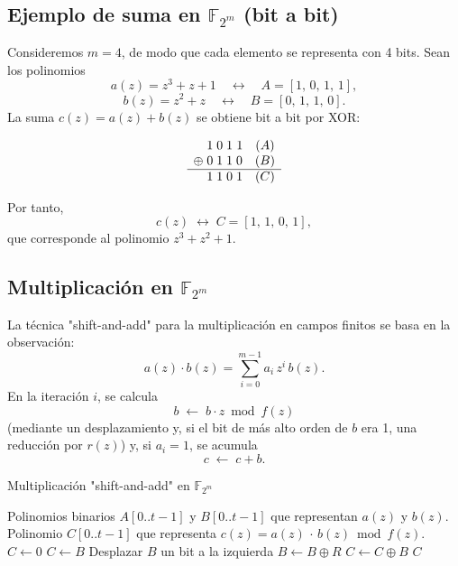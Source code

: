 \subsection*{Ejemplo de suma en \(\mathbb{F}_{2^m}\) (bit a bit)}

Consideremos \(m=4\), de modo que cada elemento se representa con 4 bits. Sean los polinomios  
\[
a(z) = z^3 + z + 1 \quad\longleftrightarrow\quad A = [1,\,0,\,1,\,1],
\]
\[
b(z) = z^2 + z \quad\longleftrightarrow\quad B = [0,\,1,\,1,\,0].
\]
La suma \(c(z)=a(z)+b(z)\) se obtiene bit a bit por XOR:

\[
\begin{array}{c@{\;}c@{\;}c@{\;}c@{\;}c}
   & 1 & 0 & 1 & 1  \quad(A)\\
\oplus & 0 & 1 & 1 & 0  \quad(B)\\\hline
   & 1 & 1 & 0 & 1  \quad(C)
\end{array}
\]

Por tanto,
\[
c(z) \;\longleftrightarrow\; C = [1,\,1,\,0,\,1],
\]
que corresponde al polinomio \(z^3 + z^2 + 1\).


\subsection{Multiplicación en \texorpdfstring{$\mathbb{F}_{2^m}$}{F2m}}
La técnica "shift-and-add" para la multiplicación en campos finitos se basa en la observación:
\[
  a(z)\cdot b(z)
  =\sum_{i=0}^{m-1} a_i\,z^i\,b(z).
\]
En la iteración \(i\), se calcula 
\[
  b \;\leftarrow\; b\cdot z \bmod f(z)
\]
(mediante un desplazamiento y, si el bit de más alto orden de \(b\) era 1, una reducción por \(r(z)\)) y, si \(a_i=1\), se acumula 
\[
  c \;\leftarrow\; c + b.
\]

\begin{algorithm}
\caption{Multiplicación "shift-and-add" en \(\mathbb{F}_{2^m}\)}
\label{alg:mul_f2m}
\begin{algorithmic}[1]
\REQUIRE Polinomios binarios \(A[0..t-1]\) y \(B[0..t-1]\) que representan \(a(z)\) y \(b(z)\).
\ENSURE Polinomio \(C[0..t-1]\) que representa \(c(z)=a(z)\,\cdot\,b(z)\bmod f(z)\).
\STATE \(C \gets 0\)
 \STATE \(C \gets B\) \ENDIF
{}
  \STATE Desplazar \(B\) un bit a la izquierda
   \STATE \(B \gets B \oplus R\) \ENDIF
   \STATE \(C \gets C \oplus B\) \ENDIF
\ENDFOR
\RETURN \(C\)
\end{algorithmic}
\end{algorithm}

